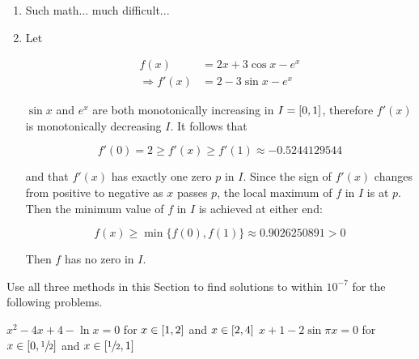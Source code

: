 \documentclass[../../../../Assignments]{subfiles}
\begin{document}
\begin{solution}
    \begin{enumerate}[label = \alph*)]
        \item Such math... much difficult...
        \item Let

            \begin{align*}
                             f(x) &= 2x + 3 \cos{x} - e^x \\
                \Rightarrow f'(x) &= 2 - 3 \sin{x} - e^x
            \end{align*}

            \(\sin{x}\) and \(e^x\) are both monotonically increasing in \(I =
            \interval{0}{1}\), therefore \(f'(x)\) is monotonically decreasing
            \(I\). It follows that

            \[f'(0) = 2 \geq f'(x) \geq f'(1) \approx \num{-0.5244129544}\]

            \noindent and that \(f'(x)\) has exactly one zero \(p\) in \(I\).
            Since the sign of \(f'(x)\) changes from positive to negative as
            \(x\) passes \(p\), the local maximum of \(f\) in \(I\) is at \(p\).
            Then the minimum value of \(f\) in \(I\) is achieved at either end:

            \[f(x) \geq \min \{f(0), f(1)\} \approx \num{0.9026250891} > 0\]

            Then \(f\) has no zero in \(I\).
    \end{enumerate}
\end{solution}

\begin{exercise}
    Use all three methods in this Section to find solutions to within
    \(10^{-7}\) for the following problems.

    \begin{tasks}
        \task \(x^2 - 4x + 4 - \ln{x} = 0\) for \(x \in \interval{1}{2}\) and
            \(x \in \interval{2}{4}\)
        \task \(x + 1 - 2 \sin{\pi x} = 0\) for \(x \in
            \interval{0}{\sfrac{1}{2}}\) and \(x \in
            \interval{\sfrac{1}{2}}{1}\)
    \end{tasks}
\end{exercise}
\end{document}
